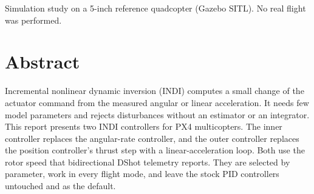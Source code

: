 



\begin{titlepage}
\thispagestyle{empty}
\par
\vspace*{3.2cm}
\vfill
{\small\color{indigrey}\raggedright
Simulation study on a 5-inch reference quadcopter (Gazebo SITL). No real flight was performed.\par}
\end{titlepage}

\chapter*{Abstract}
Incremental nonlinear dynamic inversion (INDI) computes a small change of the actuator command from the measured angular or linear acceleration.
It needs few model parameters and rejects disturbances without an estimator or an integrator.
This report presents two INDI controllers for PX4 multicopters.
The inner controller replaces the angular-rate controller, and the outer controller replaces the position controller's thrust step with a linear-acceleration loop.
Both use the rotor speed that bidirectional DShot telemetry reports.
They are selected by parameter, work in every flight mode, and leave the stock PID controllers untouched and as the default.

